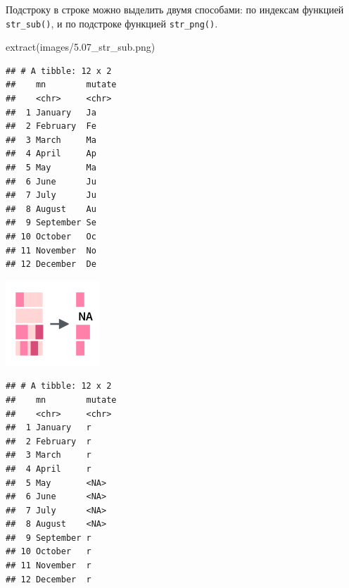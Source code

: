 \documentclass[
]{book}
\newenvironment{Shaded}{\begin{snugshade}}{\end{snugshade}}
\newcommand{\DataTypeTok}[1]{\textcolor[rgb]{0.13,0.29,0.53}{#1}}
\newcommand{\DecValTok}[1]{\textcolor[rgb]{0.00,0.00,0.81}{#1}}
\newcommand{\KeywordTok}[1]{\textcolor[rgb]{0.13,0.29,0.53}{\textbf{#1}}}
\newcommand{\NormalTok}[1]{#1}
\newcommand{\OperatorTok}[1]{\textcolor[rgb]{0.81,0.36,0.00}{\textbf{#1}}}
\newcommand{\StringTok}[1]{\textcolor[rgb]{0.31,0.60,0.02}{#1}}
\begin{document}
Подстроку в строке можно выделить двумя способами: по индексам функцией \texttt{str\_sub()}, и по подстроке функцией \texttt{str\_png()}.

extract(images/5.07\_str\_sub.png)

\begin{Shaded}
\end{Shaded}

\begin{verbatim}
## # A tibble: 12 x 2
##    mn        mutate
##    <chr>     <chr> 
##  1 January   Ja    
##  2 February  Fe    
##  3 March     Ma    
##  4 April     Ap    
##  5 May       Ma    
##  6 June      Ju    
##  7 July      Ju    
##  8 August    Au    
##  9 September Se    
## 10 October   Oc    
## 11 November  No    
## 12 December  De
\end{verbatim}

\includegraphics{images/5.08_str_extract.png}

\begin{Shaded}
\end{Shaded}

\begin{verbatim}
## # A tibble: 12 x 2
##    mn        mutate
##    <chr>     <chr> 
##  1 January   r     
##  2 February  r     
##  3 March     r     
##  4 April     r     
##  5 May       <NA>  
##  6 June      <NA>  
##  7 July      <NA>  
##  8 August    <NA>  
##  9 September r     
## 10 October   r     
## 11 November  r     
## 12 December  r
\end{verbatim}
\end{document}

